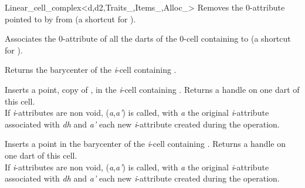 \begin{ccRefClass}{Linear_cell_complex<d,d2,Traits_,Items_,Alloc_>}
{Removes the 0-attribute pointed to by  from 
  (a shortcut for ).
}

{Associates the 0-attribute of all the darts of the 0-cell 
  containing  to 
  (a shortcut for ).
}


{Returns the barycenter of the \emph{i}-cell containing .
}

{Inserts a point, copy of , in the \emph{i}-cell containing .
  Returns a handle on one dart of this cell.  
  \\
    If \emph{i}-attributes are non void, 
    (\emph{a},\emph{a'}) is called, 
    with \emph{a} the original \emph{i}-attribute associated
    with \emph{dh} and \emph{a'} each new \emph{i}-attribute created during the operation.
}

{Inserts a point in the barycenter of the \emph{i}-cell containing .
  Returns a handle on one dart of this cell.  
  \\
    If \emph{i}-attributes are non void, 
    (\emph{a},\emph{a'}) is called,
    with \emph{a} the original \emph{i}-attribute associated
    with \emph{dh} and \emph{a'} each new \emph{i}-attribute created during the operation.
}


\end{ccRefClass}
